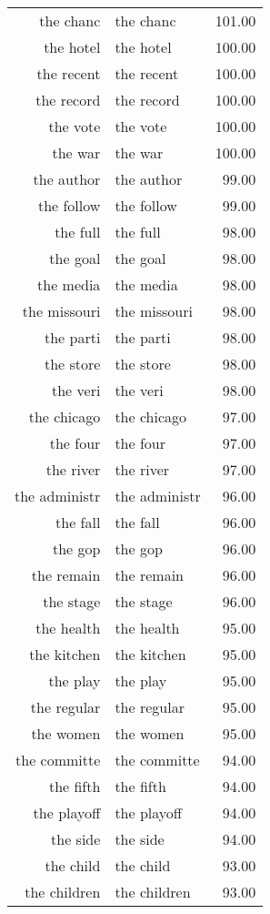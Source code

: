 \begin{table}[ht]
\begin{tabular}{rlr}
  the chanc & the chanc & 101.00 \\ 
  the hotel & the hotel & 100.00 \\ 
  the recent & the recent & 100.00 \\ 
  the record & the record & 100.00 \\ 
  the vote & the vote & 100.00 \\ 
  the war & the war & 100.00 \\ 
  the author & the author & 99.00 \\ 
  the follow & the follow & 99.00 \\ 
  the full & the full & 98.00 \\ 
  the goal & the goal & 98.00 \\ 
  the media & the media & 98.00 \\ 
  the missouri & the missouri & 98.00 \\ 
  the parti & the parti & 98.00 \\ 
  the store & the store & 98.00 \\ 
  the veri & the veri & 98.00 \\ 
  the chicago & the chicago & 97.00 \\ 
  the four & the four & 97.00 \\ 
  the river & the river & 97.00 \\ 
  the administr & the administr & 96.00 \\ 
  the fall & the fall & 96.00 \\ 
  the gop & the gop & 96.00 \\ 
  the remain & the remain & 96.00 \\ 
  the stage & the stage & 96.00 \\ 
  the health & the health & 95.00 \\ 
  the kitchen & the kitchen & 95.00 \\ 
  the play & the play & 95.00 \\ 
  the regular & the regular & 95.00 \\ 
  the women & the women & 95.00 \\ 
  the committe & the committe & 94.00 \\ 
  the fifth & the fifth & 94.00 \\ 
  the playoff & the playoff & 94.00 \\ 
  the side & the side & 94.00 \\ 
  the child & the child & 93.00 \\ 
  the children & the children & 93.00 \\ 

\end{tabular}
\end{table}
